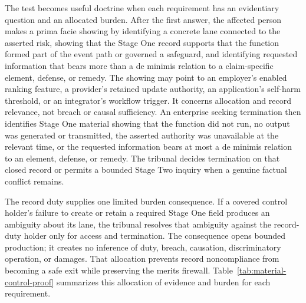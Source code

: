 The test becomes useful doctrine when each requirement has an evidentiary question and an allocated burden. After the first answer, the affected person makes a prima facie showing by identifying a concrete lane connected to the asserted risk, showing that the Stage One record supports that the function formed part of the event path or governed a safeguard, and identifying requested information that bears more than a de minimis relation to a claim-specific element, defense, or remedy. The showing may point to an employer's enabled ranking feature, a provider's retained update authority, an application's self-harm threshold, or an integrator's workflow trigger. It concerns allocation and record relevance, not breach or causal sufficiency. An enterprise seeking termination then identifies Stage One material showing that the function did not run, no output was generated or transmitted, the asserted authority was unavailable at the relevant time, or the requested information bears at most a de minimis relation to an element, defense, or remedy. The tribunal decides termination on that closed record or permits a bounded Stage Two inquiry when a genuine factual conflict remains.

The record duty supplies one limited burden consequence. If a covered control holder's failure to create or retain a required Stage One field produces an ambiguity about its lane, the tribunal resolves that ambiguity against the record-duty holder only for access and termination. The consequence opens bounded production; it creates no inference of duty, breach, causation, discriminatory operation, or damages. That allocation prevents record noncompliance from becoming a safe exit while preserving the merits firewall. Table~\ref{tab:material-control-proof} summarizes this allocation of evidence and burden for each requirement.

